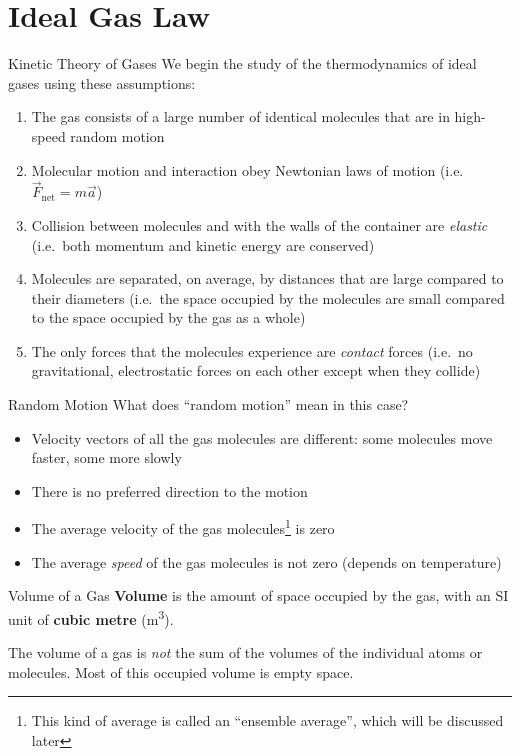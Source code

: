 \documentclass[12pt,aspectratio=169,dvipsnames]{beamer}
\begin{document}
\section{Ideal Gas Law}

\begin{frame}{Kinetic Theory of Gases}
  We begin the study of the thermodynamics of ideal gases using these
  assumptions:
  \begin{enumerate}
  \item The gas consists of a large number of identical molecules that are in
    high-speed random motion
  \item Molecular motion and interaction obey Newtonian laws of motion (i.e.\
    $\vec F_\text{net}=m\vec a$)
  \item Collision between molecules and with the walls of the container are
    \emph{elastic} (i.e.\ both momentum and kinetic energy are conserved)
  \item Molecules are separated, on average, by distances that are large
    compared to their diameters (i.e.\ the space occupied by the molecules are
    small compared to the space occupied by the gas as a whole)
  \item The only forces that the molecules experience are \emph{contact} forces
    (i.e.\ no gravitational, electrostatic forces on each other except when
    they collide)
  \end{enumerate}
\end{frame}



\begin{frame}{Random Motion}
  What does ``random motion'' mean in this case?
  \begin{itemize}
  \item Velocity vectors of all the gas molecules are different: some molecules
    move faster, some more slowly
  \item There is no preferred direction to the motion
  \item The average velocity of the gas molecules\footnote{This kind of average
  is called an ``ensemble average'', which will be discussed later} is zero
  \item The average \emph{speed} of the gas molecules is not zero (depends on
    temperature)
  \end{itemize}
\end{frame}


\begin{frame}{Volume of a Gas}
  \textbf{Volume} is the amount of space occupied by the gas, with an SI unit of
  \textbf{cubic metre} (\si{\metre\cubed}).
  \begin{center}
  \end{center}
  The volume of a gas is \emph{not} the sum of the volumes of the individual
  atoms or molecules. Most of this occupied volume is empty space.
\end{frame}
\end{document}
